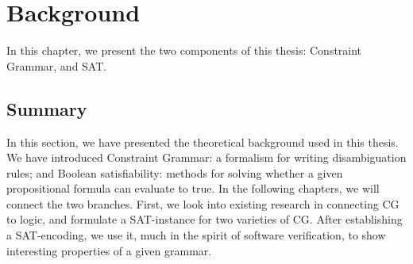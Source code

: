 \chapter{Background}

In this chapter, we present the two components of this thesis: Constraint Grammar, and SAT.






\section{Summary}

In this section, we have presented the theoretical background used in this thesis. 
We have introduced Constraint Grammar: a formalism for writing disambiguation rules; and Boolean satisfiability: methods for solving whether a given propositional formula can evaluate to true.
In the following chapters, we will connect the two branches. First, we look into existing research in connecting CG to logic, and formulate a SAT-instance for two varieties of CG. After establishing a SAT-encoding, we use it, much in the spirit of software verification, to show interesting properties of a given grammar. 



 






